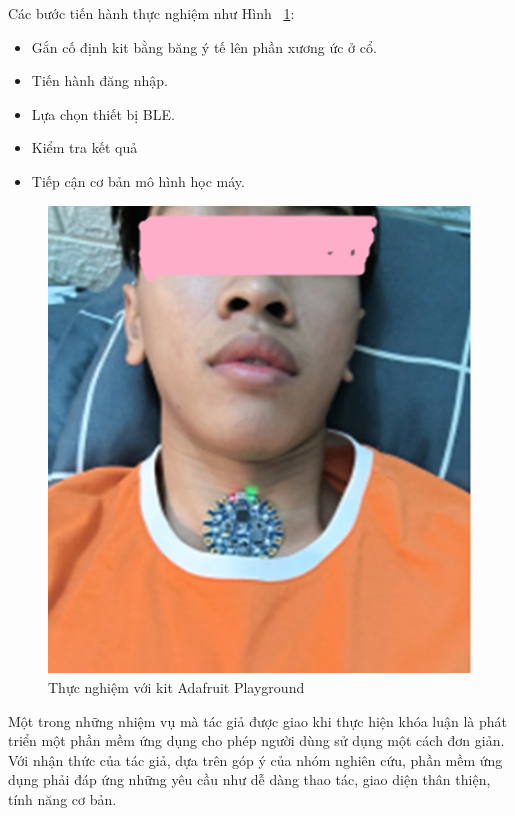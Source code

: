 Các bước tiến hành thực nghiệm như Hình ~\ref{thucnghiem}:
\begin{itemize}
    \item Gắn cố định kit bằng băng ý tế lên phần xương ức ở cổ.
    
    \item Tiến hành đăng nhập.
    \item Lựa chọn thiết bị BLE.

    \item Kiểm tra kết quả

    \item Tiếp cận cơ bản mô hình học máy.
    
\end{itemize}
\begin{figure} [b!]
    \centering
    \includegraphics[width=0.6\linewidth]{images/thucnghiem.png}
    \caption{Thực nghiệm với kit Adafruit Playground}
    \label{thucnghiem}
\end{figure}


Một trong những nhiệm vụ mà tác giả được giao khi thực hiện khóa luận là phát triển một phần mềm ứng dụng cho phép người dùng sử dụng một cách đơn giản. Với nhận thức của tác giả, dựa trên góp ý của nhóm nghiên cứu, phần mềm ứng dụng phải đáp ứng những yêu cầu như dễ dàng thao tác, giao diện thân thiện, tính năng cơ bản.

